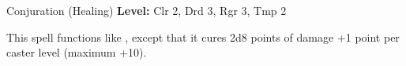 {Conjuration (Healing)}
{
	\textbf{Level:}
	Clr 2, Drd 3, Rgr 3, Tmp 2\\
}
{
	This spell functions like , except that it cures 2d8 points of damage +1 point per caster level (maximum +10).

}
